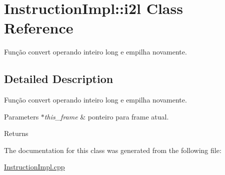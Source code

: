 \hypertarget{class_instruction_impl_1_1i2l}{}\section{Instruction\+Impl\+:\+:i2l Class Reference}
\label{class_instruction_impl_1_1i2l}


Função convert operando inteiro long e empilha novamente.  




\subsection{Detailed Description}
Função convert operando inteiro long e empilha novamente. 


\begin{DoxyParams}{Parameters}
{\em $\ast$this\+\_\+frame} & ponteiro para frame atual. \\
\hline
\end{DoxyParams}
\begin{DoxyReturn}{Returns}

\end{DoxyReturn}


The documentation for this class was generated from the following file\+:\begin{DoxyCompactItemize}
\item 
\hyperlink{_instruction_impl_8cpp}{Instruction\+Impl.\+cpp}\end{DoxyCompactItemize}
